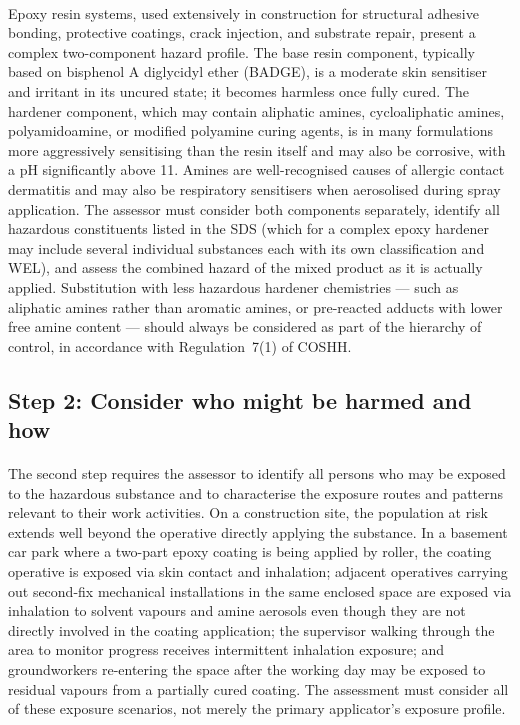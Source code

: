 \paragraph{}
Epoxy resin systems, used extensively in construction for structural adhesive bonding, protective coatings, crack injection, and substrate repair, present a complex two-component hazard profile. The base resin component, typically based on bisphenol A diglycidyl ether (BADGE), is a moderate skin sensitiser and irritant in its uncured state; it becomes harmless once fully cured. The hardener component, which may contain aliphatic amines, cycloaliphatic amines, polyamidoamine, or modified polyamine curing agents, is in many formulations more aggressively sensitising than the resin itself and may also be corrosive, with a pH significantly above 11. Amines are well-recognised causes of allergic contact dermatitis and may also be respiratory sensitisers when aerosolised during spray application. The assessor must consider both components separately, identify all hazardous constituents listed in the SDS (which for a complex epoxy hardener may include several individual substances each with its own classification and WEL), and assess the combined hazard of the mixed product as it is actually applied. Substitution with less hazardous hardener chemistries — such as aliphatic amines rather than aromatic amines, or pre-reacted adducts with lower free amine content — should always be considered as part of the hierarchy of control, in accordance with Regulation~7(1) of COSHH.

\subsection{Step 2: Consider who might be harmed and how}

\paragraph{}
The second step requires the assessor to identify all persons who may be exposed to the hazardous substance and to characterise the exposure routes and patterns relevant to their work activities. On a construction site, the population at risk extends well beyond the operative directly applying the substance. In a basement car park where a two-part epoxy coating is being applied by roller, the coating operative is exposed via skin contact and inhalation; adjacent operatives carrying out second-fix mechanical installations in the same enclosed space are exposed via inhalation to solvent vapours and amine aerosols even though they are not directly involved in the coating application; the supervisor walking through the area to monitor progress receives intermittent inhalation exposure; and groundworkers re-entering the space after the working day may be exposed to residual vapours from a partially cured coating. The assessment must consider all of these exposure scenarios, not merely the primary applicator's exposure profile.

